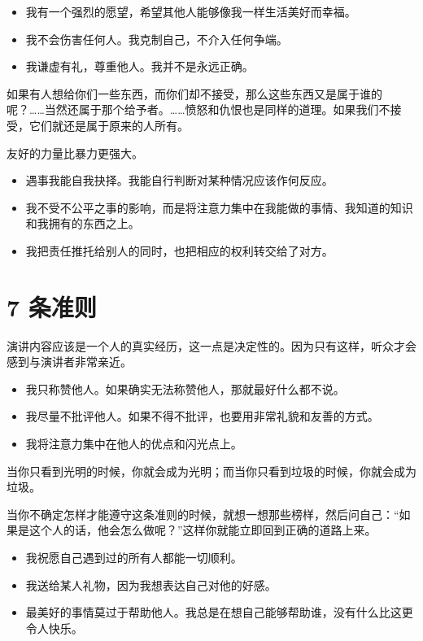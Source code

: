 \documentclass{ctexart}
\begin{document}
\begin{itemize}
    \item 我有一个强烈的愿望，希望其他人能够像我一样生活美好而幸福。
    \item 我不会伤害任何人。我克制自己，不介入任何争端。
    \item 我谦虚有礼，尊重他人。我并不是永远正确。
\end{itemize}


如果有人想给你们一些东西，而你们却不接受，那么这些东西又是属于谁的呢？……当然还属于那个给予者。……愤怒和仇恨也是同样的道理。如果我们不接受，它们就还是属于原来的人所有。

友好的力量比暴力更强大。

\begin{itemize}
    \item 遇事我能自我抉择。我能自行判断对某种情况应该作何反应。
    \item 我不受不公平之事的影响，而是将注意力集中在我能做的事情、我知道的知识和我拥有的东西之上。
    \item 我把责任推托给别人的同时，也把相应的权利转交给了对方。
\end{itemize}

\section{7 条准则}

演讲内容应该是一个人的真实经历，这一点是决定性的。因为只有这样，听众才会感到与演讲者非常亲近。

\begin{itemize}
    \item 我只称赞他人。如果确实无法称赞他人，那就最好什么都不说。
    \item 我尽量不批评他人。如果不得不批评，也要用非常礼貌和友善的方式。
    \item 我将注意力集中在他人的优点和闪光点上。
\end{itemize}

当你只看到光明的时候，你就会成为光明；而当你只看到垃圾的时候，你就会成为垃圾。

当你不确定怎样才能遵守这条准则的时候，就想一想那些榜样，然后问自己：“如果是这个人的话，他会怎么做呢？”这样你就能立即回到正确的道路上来。

\begin{itemize}
    \item 我祝愿自己遇到过的所有人都能一切顺利。
    \item 我送给某人礼物，因为我想表达自己对他的好感。
    \item 最美好的事情莫过于帮助他人。我总是在想自己能够帮助谁，没有什么比这更令人快乐。
\end{itemize}
\end{document}
